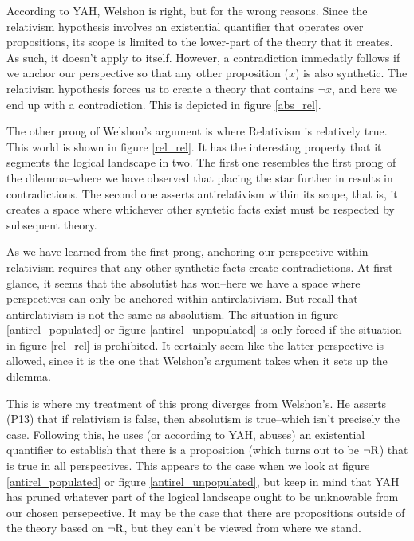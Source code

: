 \documentclass[12pt]{article}
\begin{document}
\begin{flushleft}
According to YAH, Welshon is right, but for the wrong reasons.
Since the relativism hypothesis involves an existential quantifier that operates over propositions, its scope is limited to the lower-part of the theory that it creates.
As such, it doesn't apply to itself.
However, a contradiction immedatly follows if we anchor our perspective so that any other proposition ($x$) is also synthetic.
The relativism hypothesis forces us to create a theory that contains $\neg x$, and here we end up with a contradiction.
This is depicted in figure \ref{abs_rel}.

The other prong of Welshon's argument is where Relativism is relatively true.
This world is shown in figure \ref{rel_rel}.
It has the interesting property that it segments the logical landscape in two.
The first one resembles the first prong of the dilemma--where we have observed that placing the star further in results in contradictions.
The second one asserts antirelativism within its scope, that is, it creates a space where whichever other syntetic facts exist must be respected by subsequent theory.

As we have learned from the first prong, anchoring our perspective within relativism requires that any other synthetic facts create contradictions.
At first glance, it seems that the absolutist has won--here we have a space where perspectives can only be anchored within antirelativism.
But recall that antirelativism is not the same as absolutism.
The situation in figure \ref{antirel_populated} or figure \ref{antirel_unpopulated} is only forced if the situation in figure \ref{rel_rel} is prohibited.
It certainly seem like the latter perspective is allowed, since it is the one that Welshon's argument takes when it sets up the dilemma.

This is where my treatment of this prong diverges from Welshon's.
He asserts (P13) that if relativism is false, then absolutism is true--which isn't precisely the case.
Following this, he uses (or according to YAH, abuses) an existential quantifier to establish that there is a proposition (which turns out to be $\neg \textnormal{R}$) that is true in all perspectives.
This appears to the case when we look at figure \ref{antirel_populated} or figure \ref{antirel_unpopulated}, but keep in mind that YAH has pruned whatever part of the logical landscape ought to be unknowable from our chosen persepective.
It may be the case that there are propositions outside of the theory based on $\neg \textnormal{R}$, but they can't be viewed from where we stand.


\end{flushleft}
\end{document}
